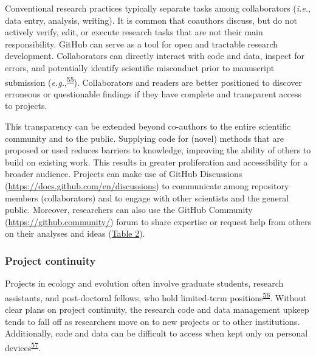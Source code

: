Conventional research practices typically separate tasks among collaborators (\emph{i.e.}, data entry, analysis, writing).
It is common that coauthors discuss, but do not actively verify, edit, or execute research tasks that are not their main responsibility.
GitHub can serve as a tool for open and tractable research development.
Collaborators can directly interact with code and data, inspect for errors, and potentially identify scientific misconduct prior to manuscript submission (\emph{e.g.},\textsuperscript{\protect\hyperlink{ref-18PTmKJkq}{55}}).
Collaborators and readers are better positioned to discover erroneous or questionable findings if they have complete and transparent access to projects.

This transparency can be extended beyond co-authors to the entire scientific community and to the public.
Supplying code for (novel) methods that are proposed or used reduces barriers to knowledge, improving the ability of others to build on existing work.
This results in greater proliferation and accessibility for a broader audience.
Projects can make use of GitHub Discussions (\url{https://docs.github.com/en/discussions}) to communicate among repository members (collaborators) and to engage with other scientists and the general public.
Moreover, researchers can also use the GitHub Community (\url{https://github.community/}) forum to share expertise or request help from others on their analyses and ideas (\protect\hyperlink{tbl:roles}{Table 2}).

\hypertarget{project-continuity}{%
\subsubsection{Project continuity}\label{project-continuity}}

Projects in ecology and evolution often involve graduate students, research assistants, and post-doctoral fellows, who hold limited-term positions\textsuperscript{\protect\hyperlink{ref-D4C4k4ak}{56}}.
Without clear plans on project continuity, the research code and data management upkeep tends to fall off as researchers move on to new projects or to other institutions.
Additionally, code and data can be difficult to access when kept only on personal devices\textsuperscript{\protect\hyperlink{ref-19kmNxiHc}{57}}.

